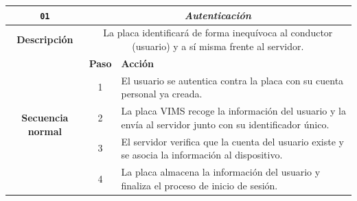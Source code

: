 \begin{table}[H]
  \centering
  \begin{tabularx}{\textwidth}{|c|c|X|}
    \hline
    \texttt{01}                                & \multicolumn{2}{c|}{\textit{Autenticación}}                                                                                                                                                                                                                 \\
    \hline
    \textbf{Descripción}                       & \multicolumn{2}{X|}{La placa identificará de forma inequívoca al conductor (usuario) y a sí misma frente al servidor.}                                                                                                                                      \\
    \hline
    \multirow{5}{*}{\textbf{Secuencia normal}} & \textbf{Paso}                                                                                                          & \textbf{Acción}                                                                                                                    \\
    \cline{2-3}
                                               & 1                                                                                                                      & \multicolumn{1}{L|}{El usuario se autentica contra la placa con su cuenta personal ya creada.}                                     \\
    \cline{2-3}
                                               & 2                                                                                                                      & \multicolumn{1}{L|}{La placa \ac{VIMS} recoge la información del usuario y la envía al servidor junto con su identificador único.} \\
    \cline{2-3}
                                               & 3                                                                                                                      & \multicolumn{1}{L|}{El servidor verifica que la cuenta del usuario existe y se asocia la información al dispositivo.}              \\
    \cline{2-3}
                                               & 4                                                                                                                      & \multicolumn{1}{L|}{La placa almacena la información del usuario y finaliza el proceso de inicio de sesión.}                       \\

\end{tabularx}
\end{table}
